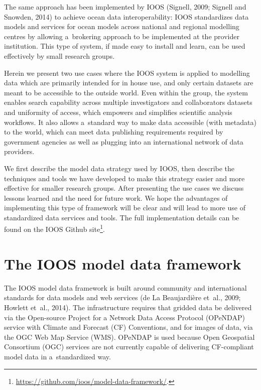\documentclass[osd, online, hvmath]{copernicus}
\begin{document}
The same approach has been implemented  by IOOS (Signell, 2009; Signell and Snowden, 2014) to achieve ocean data interoperability: IOOS standardizes data models and services for ocean models across national and regional modelling centres by allowing a~brokering approach to be implemented at the provider institution. This type of
system, if made easy to install and learn, can be used effectively by
small research groups.

Herein we present two use cases where the IOOS system is applied to
modelling data which are primarily intended for in house use, and only
certain datasets are meant to be accessible to the outside world. Even
within the group, the system enables search capability across multiple
investigators and collaborators datasets and uniformity of access,
which empowers and simplifies scientific analysis workflows. It also
allows   a~standard way to make data accessible (with metadata) to
the world, which can meet data publishing requirements required by
government agencies as well as plugging into an international network
of data providers.

We first describe the model data strategy used by IOOS, then describe
the techniques and tools we have developed to make this strategy
easier and more effective for smaller research groups. 
After presenting the use cases we discuss lessons learned and the need for future work. 
We hope the advantages of implementing this type of framework will be clear and will 
lead to more use of standardized data services and tools.  The full implementation details
can be found on the IOOS Github site\footnote{\url{https://github.com/ioos/model-data-framework/}.}.





\section{The IOOS model data framework}

The IOOS model data framework is built around community and
international standards for data models and web services (de La
Beaujardi\`{e}re et~al., 2009; Howlett et~al., 2014). The
infrastructure requires that gridded data be delivered via the Open-source Project for a Network Data Access Protocol (OPeNDAP)
service with Climate and Forecast (CF) Conventions, and for images of data, via the OGC Web Map Service (WMS). OPeNDAP is used
because Open Geospatial Consortium (OGC) services are not currently capable of delivering CF-compliant model data in a~standardized way.
\end{document}
